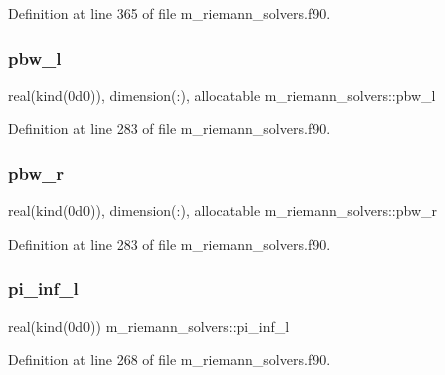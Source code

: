 Definition at line 365 of file m\+\_\+riemann\+\_\+solvers.\+f90.

\mbox{\label{namespacem__riemann__solvers_a31ac5fad05a69c3c0c76fbdc872f5494}} 
\subsubsection{\texorpdfstring{pbw\+\_\+l}{pbw\_l}}
{\footnotesize\ttfamily real(kind(0d0)), dimension(\+:), allocatable m\+\_\+riemann\+\_\+solvers\+::pbw\+\_\+l}



Definition at line 283 of file m\+\_\+riemann\+\_\+solvers.\+f90.

\mbox{\label{namespacem__riemann__solvers_af14a2b29ba2692adfb1ed257e91482e8}} 
\subsubsection{\texorpdfstring{pbw\+\_\+r}{pbw\_r}}
{\footnotesize\ttfamily real(kind(0d0)), dimension(\+:), allocatable m\+\_\+riemann\+\_\+solvers\+::pbw\+\_\+r}



Definition at line 283 of file m\+\_\+riemann\+\_\+solvers.\+f90.

\mbox{\label{namespacem__riemann__solvers_ac90ee6bf146aa47944bb11cd5de0a580}} 
\subsubsection{\texorpdfstring{pi\+\_\+inf\+\_\+l}{pi\_inf\_l}}
{\footnotesize\ttfamily real(kind(0d0)) m\+\_\+riemann\+\_\+solvers\+::pi\+\_\+inf\+\_\+l}



Definition at line 268 of file m\+\_\+riemann\+\_\+solvers.\+f90.

